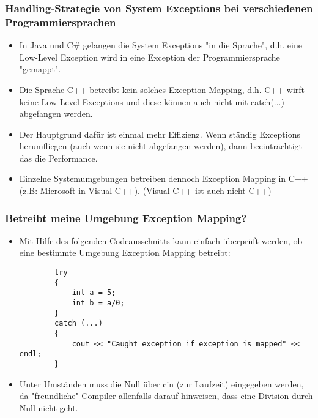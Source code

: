 \subsubsection{Handling-Strategie von System Exceptions bei verschiedenen Programmiersprachen}
\label{sec:Handling-Strategie von System Exceptions bei verschiedenen Programmiersprachen}
\begin{itemize}
	\item In Java und C\# gelangen die System Exceptions "in die Sprache", d.h. eine Low-Level Exception wird in eine Exception der Programmiersprache "gemappt".
	\item Die Sprache C++ betreibt kein solches Exception Mapping, d.h. C++ wirft keine Low-Level Exceptions und diese können auch nicht mit catch(...) abgefangen werden.
	\item Der Hauptgrund dafür ist einmal mehr Effizienz. Wenn ständig Exceptions herumfliegen (auch wenn sie nicht abgefangen werden), dann beeinträchtigt das die Performance.
	\item Einzelne Systemumgebungen betreiben dennoch Exception Mapping in C++ (z.B: Microsoft in Visual C++). \tiny(Visual C++ ist auch nicht C++)
\end{itemize}

\subsubsection{Betreibt meine Umgebung Exception Mapping?}
\label{sec:Betreibt meine Umgebung Exception Mapping?}
\begin{itemize}
	\item Mit Hilfe des folgenden Codeausschnitts kann einfach überprüft werden, ob eine bestimmte Umgebung Exception Mapping betreibt:
	\noindent
	\begin{minipage}{\linewidth}
		\begin{lstlisting}
		try
		{
			int a = 5;
			int b = a/0;
		}
		catch (...)
		{
			cout << "Caught exception if exception is mapped" << endl;
		}
		\end{lstlisting}
	\end{minipage}
	\item Unter Umständen muss die Null über cin (zur Laufzeit) eingegeben werden, da "freundliche" Compiler allenfalls darauf hinweisen, dass eine Division durch Null nicht geht.
\end{itemize}